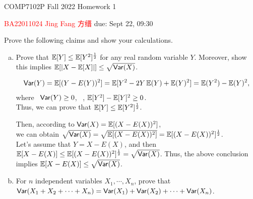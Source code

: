 



\noindent
\hspace*{.2in} COMP7102P Fall 2022
\hfill Homework 1\\
\begin{CJK}{UTF8}{gbsn}
\hspace*{.2in} \textcolor{red}{BA22011024 Jing Fang 方缙} \hfill due: Sept 22, 09:30
\end{CJK}

\bigskip

\begin{problem}[30 points]
Prove the following claims and show your calculations.
\begin{enumerate}[(a)]
\item Prove that $\operatorname*{\mathbb{E}}[Y] \le \operatorname*{\mathbb{E}}[Y^2]^\frac{1}{2}$ for any real random variable $Y$. Moreover, show this implies $\operatorname*{\mathbb{E}}[|X - \operatorname*{\mathbb{E}}[X]|] \le \sqrt{\mathsf{Var}(X)}$.

\Answer
\begin{equation}
\begin{aligned}
\mathsf{Var}(Y) = \operatorname*{\mathbb{E}}[(Y - E(Y))^2] = \operatorname*{\mathbb{E}}[Y^2 - 2Y\operatorname*{\mathbb{E}}(Y) + \operatorname*{\mathbb{E}}(Y)^2] = \operatorname*{\mathbb{E}}(Y^2) - \operatorname*{\mathbb{E}}(Y)^2, \notag \\
\end{aligned}
\end{equation}
where \ $\mathsf{Var}(Y) \ge 0$, \ \ie,  $\operatorname*{\mathbb{E}}[Y^2] - \operatorname*{\mathbb{E}}[Y]^2 \ge 0$.   \\
Thus, we can prove that $\operatorname*{\mathbb{E}}[Y] \le \operatorname*{\mathbb{E}}[Y^2]^\frac{1}{2}$.

Then, according to $\mathsf{Var}(X) = \operatorname*{\mathbb{E}}[(X - E(X))^2]$, \\
we can obtain $\sqrt{\mathsf{Var}(X)} = \sqrt{\operatorname*{\mathbb{E}}[(X - E(X))^2]} = \operatorname*{\mathbb{E}}[(X - E(X))^2]^\frac{1}{2}$. \\
Let's assume that $Y = X - E(X)$, and then $\operatorname*{\mathbb{E}}[X - E(X)] \le \operatorname*{\mathbb{E}}[(X - E(X))^2]^\frac{1}{2} = \sqrt{\mathsf{Var}(X)}$.
Thus, the above conclusion implies $\operatorname*{\mathbb{E}}[X - E(X)] \le \sqrt{\mathsf{Var}(X)}$.


\item For $n$ independent variables $X_1, \cdots, X_n$, prove that $\mathsf{Var}(X_1 + X_2 + \cdots + X_n) = \mathsf{Var}(X_1) + \mathsf{Var}(X_2) + \cdots + \mathsf{Var}(X_n)$.

\Answer


\end{enumerate}
\end{problem}
